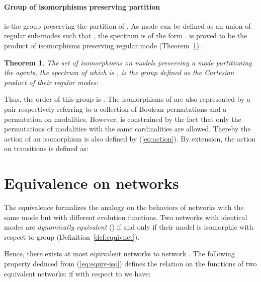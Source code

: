 \documentclass[12pt]{elsarticle}
\newtheorem{theorem}{Theorem}
\begin{document}
\paragraph{Group of isomorphisms preserving partition}    is the group preserving the partition  of . As mode  can be defined as an union of regular sub-modes  such that ,  the spectrum is of the form .   is proved to be the product of isomorphisms preserving regular mode (Theorem~\ref{the:sm}). 
\begin{theorem} 
\label{the:sm}
The set of isomorphisms on models preserving a mode partitioning the agents, the spectrum of which is , is the group defined as the Cartesian product of their regular modes:

\end{theorem}
Thus, the order of this group is .
The isomorphisms of   are also represented by a pair  respectively referring to a collection of Boolean permutations and a permutation on modalities. However,  is constrained by the fact that only the permutations of modalities with the same cardinalities are allowed. Thereby the action of an isomorphism  is also defined by (\ref{eq:action}). By extension, the  action on transitions  is defined as:







\section{Equivalence on networks}
\label{sec:evo-fun}
The equivalence formalizes the analogy on the behaviors of networks with the same mode but with different evolution functions.  Two networks with identical modes are \emph{dynamically equivalent} () if and only if their model is isomorphic with respect to  group (Definition~\ref{def:equivnet}).
\begin{definition}
\label{def:equivnet}

\end{definition}

 Hence, there exists at most  equivalent networks to network . 
The following property deduced from (\ref{eq:equiv-iso}) defines the relation on the functions of two equivalent networks: if  with respect to  we have:
\end{document}
